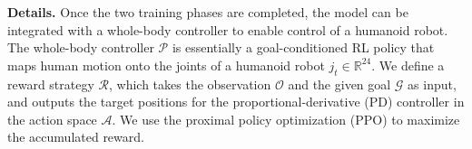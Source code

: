 \textbf{Details.}
Once the two training phases are completed, the model can be integrated with a whole-body controller to enable control of a humanoid robot. 
The whole-body controller $\mathcal{P}$ is essentially a goal-conditioned RL policy that maps human motion onto the joints of a humanoid robot $j_t\in \mathbb{R}^{24}$. We define a reward strategy $\mathcal{R}$, which takes the observation $\mathcal{O}$ and the given goal $\mathcal{G}$ as input, and outputs the target positions for the proportional-derivative (PD) controller in the action space $\mathcal{A}$. We use the proximal policy optimization (PPO) \citep{schulman2017proximal} to maximize the accumulated reward.



